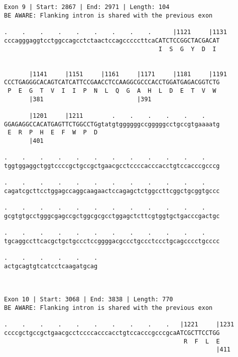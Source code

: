 \documentclass{article}
\begin{document}
\begin{Verbatim}
                    
 
Exon 9 | Start: 2867 | End: 2971 | Length: 104
BE AWARE: Flanking intron is shared with the previous exon
 
.    .    .    .    .    .    .    .    .      |1121     |1131
cccagggaggtcctggccagcctctaactccagcccccttcaCATCTCCGGCTACGACAT
                                           I  S  G  Y  D  I 
                                                            
  
       |1141     |1151     |1161     |1171     |1181     |1191
CCCTGAGGGCACAGTCATCATTCCGAACCTCCAAGGCGCCCACCTGGATGAGACGGTCTG
 P  E  G  T  V  I  I  P  N  L  Q  G  A  H  L  D  E  T  V  W 
       |381                          |391                   
  
       |1201     |1211        .    .    .    .    .    .    
GGAGAGGCCACATGAGTTCTGGCCTGgtatgtggggggccgggggcctgccgtgaaaatg
 E  R  P  H  E  F  W  P  D                                  
       |401                                                 
  
.    .    .    .    .    .    .    .    .    .    .    .    
tggtggaggctggtccccgctgccgctgaacgcctccccacccacctgtccacccgcccg
                                                            
.    .    .    .    .    .    .    .    .    .    .    .    
cagatcgcttcctggagccaggcaagaactccagagctctggccttcggctgcggtgccc
                                                            
.    .    .    .    .    .    .    .    .    .    .    .    
gcgtgtgcctgggcgagccgctggcgcgcctggagctcttcgtggtgctgacccgactgc
                                                            
.    .    .    .    .    .    .    .    .    .    .    .    
tgcaggccttcacgctgctgccctccggggacgccctgccctccctgcagcccctgcccc
                                                            
.    .    .    .    .    .
actgcagtgtcatcctcaagatgcag
                          
                          
 
Exon 10 | Start: 3068 | End: 3838 | Length: 770
BE AWARE: Flanking intron is shared with the previous exon
 
.    .    .    .    .    .    .    .    .    .   |1221     |1231
ccccgctgccgctgaacgcctccccacccacctgtccacccgcccgcaATCGCTTCCTGG
                                                  R  F  L  E
                                                           |411
  

\end{Verbatim}
\end{document}
